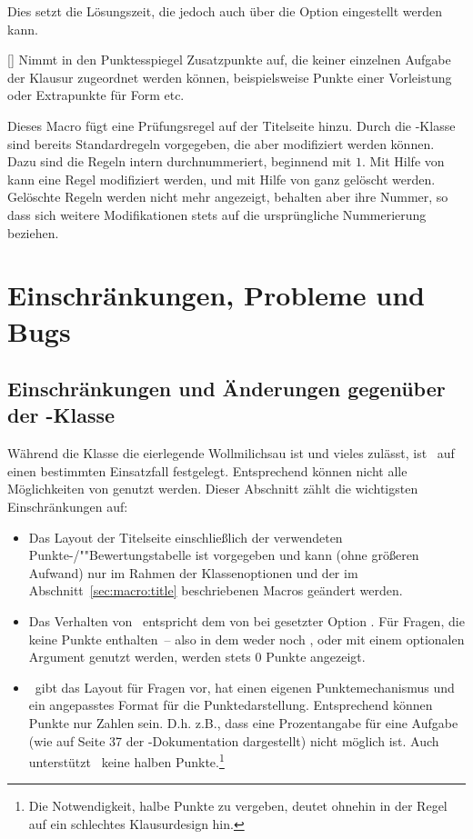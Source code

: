 \documentclass[
load=osgexam,
babel=ngerman
]{skdoc}
\begin{document}
\DescribeMacro{} Dies setzt die Lösungszeit, die jedoch auch über die Option 
eingestellt werden kann.

[]{} Nimmt in den Punktesspiegel Zusatzpunkte auf, die
keiner einzelnen Aufgabe der Klausur zugeordnet werden können, beispielsweise Punkte einer Vorleistung oder Extrapunkte
für Form etc.

Dieses Macro fügt eine Prüfungsregel auf der Titelseite hinzu. Durch die \thepkg-Klasse sind bereits Standardregeln
vorgegeben, die aber modifiziert werden können. Dazu sind die Regeln intern durchnummeriert, beginnend mit $1$. Mit
Hilfe von  kann eine Regel modifiziert werden,
und mit Hilfe von  ganz gelöscht werden. Gelöschte Regeln werden
nicht mehr angezeigt, behalten aber ihre Nummer, so dass sich weitere Modifikationen stets auf die ursprüngliche
Nummerierung beziehen.

\section{Einschränkungen, Probleme und Bugs}
\subsection{Einschränkungen und Änderungen gegenüber der -Klasse}
Während die Klasse  die eierlegende Wollmilichsau ist und vieles zulässt, ist \thepkg\ auf einen bestimmten
Einsatzfall festgelegt. Entsprechend können nicht alle Möglichkeiten von  genutzt werden.
Dieser Abschnitt zählt die wichtigsten Einschränkungen auf:
\begin{itemize}
   \item Das Layout der Titelseite einschließlich der verwendeten \mbox{Punkte-/}""Bewertungstabelle ist vorgegeben und kann (ohne größeren
    Aufwand) nur im Rahmen der Klassenoptionen und der im Abschnitt~\ref{sec:macro:title} beschriebenen Macros geändert werden.
 
    
  \item Das Verhalten von \thepkg\ entspricht dem von  bei gesetzter Option . Für Fragen, die keine
    Punkte enthalten~-- also in dem weder  noch ,  oder 
    mit einem optionalen Argument genutzt werden, werden stets 0 Punkte angezeigt.
    
  \item \thepkg\ gibt das Layout für Fragen vor, hat einen eigenen Punktemechanismus und ein angepasstes Format für
    die Punktedarstellung. Entsprechend können Punkte nur Zahlen sein. D.\;h. z.\;B., dass eine Prozentangabe für eine
    Aufgabe (wie  auf  Seite 37 der -Dokumentation dargestellt) nicht möglich ist. Auch unterstützt \thepkg\
    keine halben Punkte.\footnote{Die Notwendigkeit, halbe Punkte zu vergeben, deutet ohnehin in der Regel auf ein
      schlechtes Klausurdesign hin.}
\end{itemize}
\end{document}
